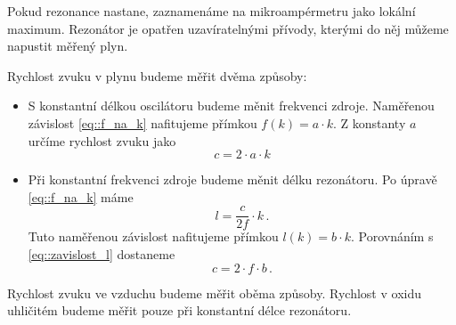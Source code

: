 Pokud rezonance nastane, zaznamenáme na mikroampérmetru jako lokální maximum.
Rezonátor je opatřen uzavíratelnými přívody, kterými do něj můžeme napustit měřený plyn.

Rychlost zvuku v plynu budeme měřit dvěma způsoby:
\begin{itemize}
\item S konstantní délkou oscilátoru budeme měnit frekvenci zdroje. Naměřenou závislost \eqref{eq::f_na_k} nafitujeme přímkou $f(k) = a \cdot k$. Z konstanty $a$ určíme rychlost zvuku jako
\begin{equation}
c = 2 \cdot a \cdot k
\end{equation}
\item Při konstantní frekvenci zdroje budeme měnit délku rezonátoru. Po úpravě \eqref{eq::f_na_k} máme
\begin{equation} \label{eq::zavislost_l}
l= \frac{c}{2f} \cdot k  \,.
\end{equation}
Tuto naměřenou závislost nafitujeme přímkou $l(k)= b \cdot k$. Porovnáním s \eqref{eq::zavislost_l} dostaneme
\begin{equation}
c = 2 \cdot f \cdot b \,.
\end{equation}
\end{itemize}

Rychlost zvuku ve vzduchu budeme měřit oběma způsoby.
Rychlost v oxidu uhličitém budeme měřit pouze při konstantní délce rezonátoru.